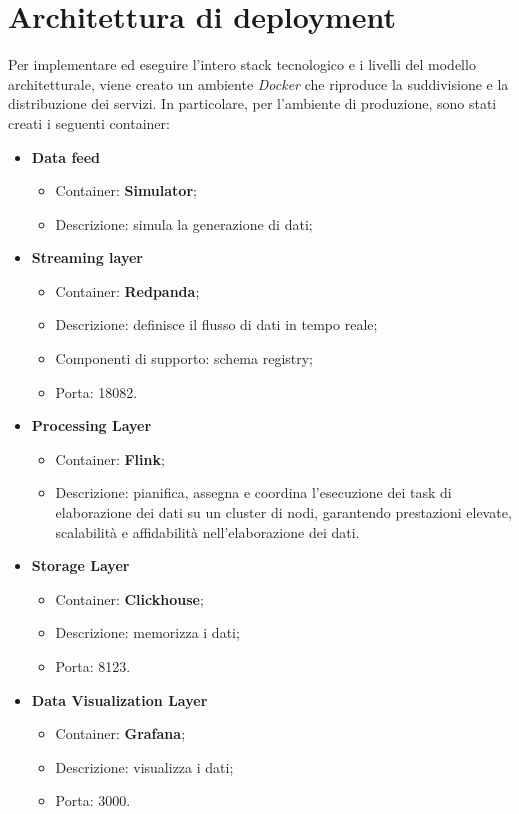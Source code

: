 \section{Architettura di deployment}
Per implementare ed eseguire l'intero stack tecnologico e i livelli del modello architetturale, viene creato un ambiente \textit{Docker} che riproduce la suddivisione e la distribuzione dei servizi. In particolare, per l'ambiente di produzione, sono stati creati i seguenti container:
\begin{itemize}
    \item \textbf{Data feed}
        \begin{itemize}
            \item Container: \textbf{Simulator};
            \item Descrizione: simula la generazione di dati;
        \end{itemize}
    \item \textbf{Streaming layer}
        \begin{itemize}
            \item Container: \textbf{Redpanda};
            \item Descrizione: definisce il flusso di dati in tempo reale;
            \item Componenti di supporto: schema registry;
            \item Porta: 18082.
        \end{itemize}
    \item \textbf{Processing Layer}
        \begin{itemize}
            \item Container: \textbf{Flink};
            \item Descrizione: pianifica, assegna e coordina l'esecuzione dei task di elaborazione dei dati su un cluster di nodi, garantendo prestazioni elevate, scalabilità e affidabilità nell'elaborazione dei dati.
        \end{itemize}
    \item \textbf{Storage Layer}
        \begin{itemize}
            \item Container: \textbf{Clickhouse};
            \item Descrizione: memorizza i dati;
            \item Porta: 8123.
        \end{itemize}
    \item \textbf{Data Visualization Layer}
        \begin{itemize}
            \item Container: \textbf{Grafana};
            \item Descrizione: visualizza i dati;
            \item Porta: 3000.
        \end{itemize}
\end{itemize}

